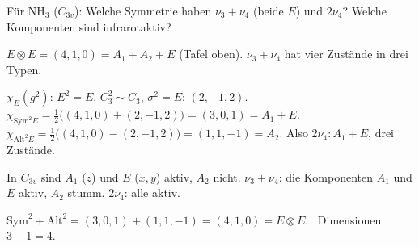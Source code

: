 \begin{aufgabe}
Für $\mathrm{NH_3}$ ($C_{3v}$): Welche Symmetrie haben $\nu_3 + \nu_4$ (beide $E$) und $2\nu_4$? Welche Komponenten sind infrarotaktiv?

\loesung
{}
$E\otimes E = (4, 1, 0) = A_1 + A_2 + E$ (Tafel oben). $\nu_3 + \nu_4$ hat vier Zustände in drei Typen.

$\chi_E(g^{2})$: $E^{2} = E$, $C_3^{2}\sim C_3$, $\sigma^{2} = E$: $(2, -1, 2)$. $\chi_{\mathrm{Sym}^{2}E} = \frac12\bigl((4, 1, 0) + (2, -1, 2)\bigr) = (3, 0, 1) = A_1 + E$. $\chi_{\mathrm{Alt}^{2}E} = \frac12\bigl((4, 1, 0) - (2, -1, 2)\bigr) = (1, 1, -1) = A_2$. Also $2\nu_4\colon A_1 + E$, drei Zustände.

In $C_{3v}$ sind $A_1$ ($z$) und $E$ ($x, y$) aktiv, $A_2$ nicht. $\nu_3 + \nu_4$: die Komponenten $A_1$ und $E$ aktiv, $A_2$ stumm. $2\nu_4$: alle aktiv.

$\mathrm{Sym}^{2} + \mathrm{Alt}^{2} = (3, 0, 1) + (1, 1, -1) = (4, 1, 0) = E\otimes E$. \checkmark\ Dimensionen $3 + 1 = 4$. \checkmark

\begin{center}
\begin{minipage}{0.88\textwidth}
\end{minipage}
\end{center}
\end{aufgabe}

